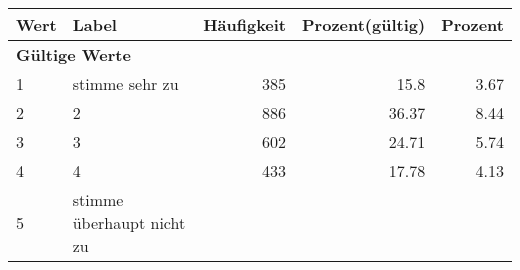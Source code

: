      \begin{longtable}{lXrrr}
     \toprule
     \textbf{Wert} & \textbf{Label} & \textbf{Häufigkeit} & \textbf{Prozent(gültig)} & \textbf{Prozent} \\
     \endhead
     \midrule
     \multicolumn{5}{l}{\textbf{Gültige Werte}}\\

     1 &
     \multicolumn{1}{X}{ stimme sehr zu   } &


       \num{385} &
       \num[round-mode=places,round-precision=2]{15,8} &
         \num[round-mode=places,round-precision=2]{3,67} \\

     2 &
     \multicolumn{1}{X}{ 2   } &


       \num{886} &
       \num[round-mode=places,round-precision=2]{36,37} &
         \num[round-mode=places,round-precision=2]{8,44} \\

     3 &
     \multicolumn{1}{X}{ 3   } &


       \num{602} &
       \num[round-mode=places,round-precision=2]{24,71} &
         \num[round-mode=places,round-precision=2]{5,74} \\

     4 &
     \multicolumn{1}{X}{ 4   } &


       \num{433} &
       \num[round-mode=places,round-precision=2]{17,78} &
         \num[round-mode=places,round-precision=2]{4,13} \\

     5 &
     \multicolumn{1}{X}{ stimme überhaupt nicht zu   } &



\end{longtable}
